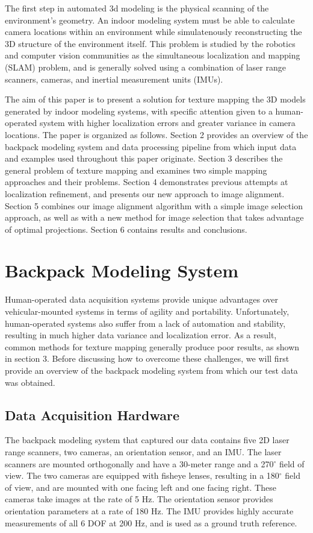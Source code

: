 \documentclass[10pt,twocolumn,letterpaper]{article}
\begin{document}
The first step in automated 3d modeling is the physical scanning of
the environment's geometry. An indoor modeling system must be able to
calculate camera locations within an environment while simulatenously
reconstructing the 3D structure of the environment itself. This
problem is studied by the robotics and computer vision communities as
the simultaneous localization and mapping (SLAM) problem, and is
generally solved using a combination of laser range scanners, cameras,
and inertial measurement units (IMUs).

The aim of this paper is to present a solution for texture mapping the
3D models generated by indoor modeling systems, with specific
attention given to a human-operated system with higher localization
errors and greater variance in camera locations. The paper is
organized as follows. Section 2 provides an overview of the backpack
modeling system and data processing pipeline from which input data and
examples used throughout this paper originate. Section 3 describes the
general problem of texture mapping and examines two simple mapping
approaches and their problems.  Section 4 demonstrates previous
attempts at localization refinement, and presents our new approach to
image alignment. Section 5 combines our image alignment algorithm with
a simple image selection approach, as well as with a new method for image selection that
takes advantage of optimal projections. Section 6 contains results and
conclusions.

\section{Backpack Modeling System}
Human-operated data acquisition systems provide unique advantages over
vehicular-mounted systems in terms of agility and
portability. Unfortunately, human-operated systems also suffer from a
lack of automation and stability, resulting in much higher data
variance and localization error. As a result, common methods for
texture mapping generally produce poor results, as shown in section
3. Before discussing how to overcome these challenges, we will first
provide an overview of the backpack modeling system from which our
test data was obtained.

\subsection{Data Acquisition Hardware}
The backpack modeling system that captured our data contains five 2D
laser range scanners, two cameras, an orientation sensor, and an
IMU. The laser scanners are mounted orthogonally and have a 30-meter
range and a 270$^{\circ}$ field of view. The two cameras are equipped
with fisheye lenses, resulting in a 180$^{\circ}$ field of view, and
are mounted with one facing left and one facing right. These cameras take images at the rate of 5 Hz. The orientation
sensor provides orientation parameters at a rate of 180 Hz. The IMU
provides highly accurate measurements of all 6 DOF at 200 Hz, and is
used as a ground truth reference.
\end{document}
